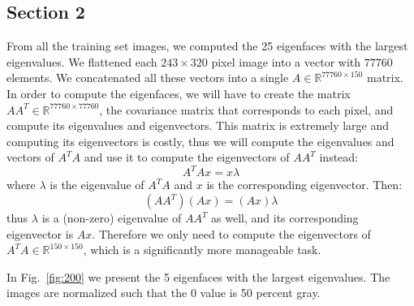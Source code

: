\documentclass[a4paper]{iacas}
\begin{document}
\subsection{Section 2}

From all the training set images, we computed the 25 eigenfaces with the largest eigenvalues. We flattened each $243 \times 320$ pixel image into a vector with $77760$ elements. We concatenated all these vectors into a single $A \in \mathbb{R}^{77760 \times 150}$ matrix. In order to compute the eigenfaces, we will have to create the matrix $AA^T \in \mathbb{R}^{77760 \times 77760}$, the covariance matrix that corresponds to each pixel, and compute its eigenvalues and eigenvectors. This matrix is extremely large and computing its eigenvectors is costly, thus we will compute the eigenvalues and vectors of $A^TA$ and use it to compute the eigenvectors of $AA^T$ instead:
%
\begin{equation}
A^TAx = x\lambda
\end{equation}
%
where $\lambda$ is the eigenvalue of $A^TA$ and $x$ is the corresponding eigenvector. Then:
%
\begin{equation}
(AA^T)(Ax) = (Ax)\lambda
\end{equation}
%
thus $\lambda$ is a (non-zero) eigenvalue of $AA^T$ as well, and its corresponding eigenvector is $Ax$. Therefore we only need to compute the eigenvectors of $A^TA \in \mathbb{R}^{150 \times 150}$, which is a significantly more manageable task.

In Fig.~\ref{fig:200} we present the 5 eigenfaces with the largest eigenvalues. The images are normalized such that the 0 value is 50 percent gray.
\end{document}
